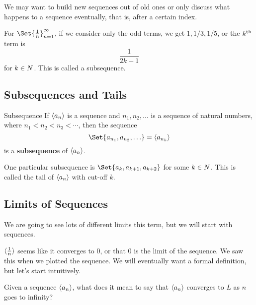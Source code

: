 We may want to build new sequences out of old ones or only discuss what happens to a sequence eventually, that is, after a certain index.
\begin{Example}{}{}
    For $ \Set{\frac{1}{n}}_{n=1}^{\infty} $, if we consider only the odd terms, we get $ 1,1/3,1/5 $, or the $ k\textsuperscript{th} $
    term is
    \[ \frac{1}{2k-1} \]
    for $ k\in\relax{N} $.
    This is called a subsequence.
\end{Example}
\subsection{Subsequences and Tails}
\begin{Definition}{Subsequence}{}
    If $ \langle a_n\rangle $ is a sequence and $ {n_1,n_2,\ldots} $ is a sequence of natural numbers, where
    $ n_1<n_2<n_3<\cdots $, then the sequence
    \[ \Set{a_{n_1},a_{n_2},\ldots}=\sequence{a_{n_k}} \]
    is a \textbf{subsequence} of $ \langle a_n\rangle $.
\end{Definition}
One particular subsequence is $ \Set{a_k,a_{k+1},a_{k+2}} $ for some $ k\in\relax{N} $.
This is called the tail of $ \langle a_n\rangle $ with cut-off $ k $.

\subsection{Limits of Sequences}
We are going to see lots of different limits this term, but we will start with sequences.
\begin{Example}{}{}
    $ \langle\frac{1}{n}\rangle $ seems like it converges to $ 0 $, or that $ 0 $ is the limit of the sequence.
    We saw this when we plotted the sequence. We will eventually want a formal definition, but let's start intuitively.
\end{Example}
Given a sequence $ \langle a_n\rangle $, what does it mean to say that $ \langle a_n\rangle $ converges to $ L $
as $ n $ goes to infinity?

